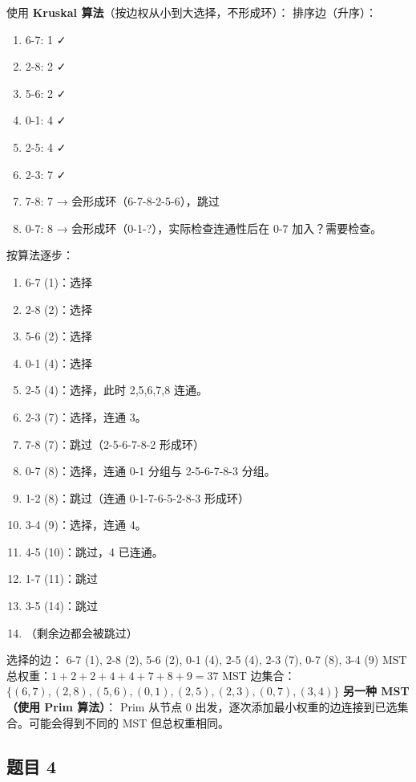\documentclass[10pt,a4paper,openany]{ctexbook}
\theoremstyle{definition}
\theoremstyle{remark}
\begin{document}
使用 \textbf{Kruskal 算法}（按边权从小到大选择，不形成环）：
排序边（升序）：
\begin{enumerate}
\item 6-7: 1 ✓
\item 2-8: 2 ✓
\item 5-6: 2 ✓
\item 0-1: 4 ✓
\item 2-5: 4 ✓
\item 2-3: 7 ✓
\item 7-8: 7 → 会形成环（6-7-8-2-5-6），跳过
\item 0-7: 8 → 会形成环（0-1-?），实际检查连通性后在 0-7 加入？需要检查。

\end{enumerate}

按算法逐步：
\begin{enumerate}
\item 6-7 (1)：选择
\item 2-8 (2)：选择
\item 5-6 (2)：选择
\item 0-1 (4)：选择
\item 2-5 (4)：选择，此时 2,5,6,7,8 连通。
\item 2-3 (7)：选择，连通 3。
\item 7-8 (7)：跳过（2-5-6-7-8-2 形成环）
\item 0-7 (8)：选择，连通 0-1 分组与 2-5-6-7-8-3 分组。
\item 1-2 (8)：跳过（连通 0-1-7-6-5-2-8-3 形成环）
\item 3-4 (9)：选择，连通 4。
\item 4-5 (10)：跳过，4 已连通。
\item 1-7 (11)：跳过
\item 3-5 (14)：跳过
\item （剩余边都会被跳过）

\end{enumerate}

选择的边：
6-7 (1), 2-8 (2), 5-6 (2), 0-1 (4), 2-5 (4), 2-3 (7), 0-7 (8), 3-4 (9)
MST 总权重：$1 + 2 + 2 + 4 + 4 + 7 + 8 + 9 = 37$
MST 边集合：$\{(6,7), (2,8), (5,6), (0,1), (2,5), (2,3), (0,7), (3,4)\}$
\textbf{另一种 MST（使用 Prim 算法）}：
Prim 从节点 0 出发，逐次添加最小权重的边连接到已选集合。可能会得到不同的 MST 但总权重相同。
\vspace{-2pt}

\subsection{题目 4}
\end{document}
